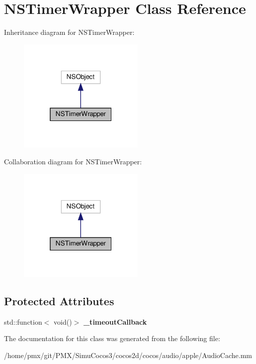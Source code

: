 \hypertarget{interfaceNSTimerWrapper}{}\section{N\+S\+Timer\+Wrapper Class Reference}
\label{interfaceNSTimerWrapper}


Inheritance diagram for N\+S\+Timer\+Wrapper\+:
\nopagebreak
\begin{figure}[H]
\begin{center}
\leavevmode
\includegraphics[width=172pt]{interfaceNSTimerWrapper__inherit__graph}
\end{center}
\end{figure}


Collaboration diagram for N\+S\+Timer\+Wrapper\+:
\nopagebreak
\begin{figure}[H]
\begin{center}
\leavevmode
\includegraphics[width=172pt]{interfaceNSTimerWrapper__coll__graph}
\end{center}
\end{figure}
\subsection*{Protected Attributes}
\begin{DoxyCompactItemize}
\item 
\mbox{\label{interfaceNSTimerWrapper_aa1c5cc4bd6a07835a6169d9489ac3e8f}} 
std\+::function$<$ void()$>$ {\bfseries \+\_\+timeout\+Callback}
\end{DoxyCompactItemize}


The documentation for this class was generated from the following file\+:\begin{DoxyCompactItemize}
\item 
/home/pmx/git/\+P\+M\+X/\+Simu\+Cocos3/cocos2d/cocos/audio/apple/Audio\+Cache.\+mm\end{DoxyCompactItemize}

